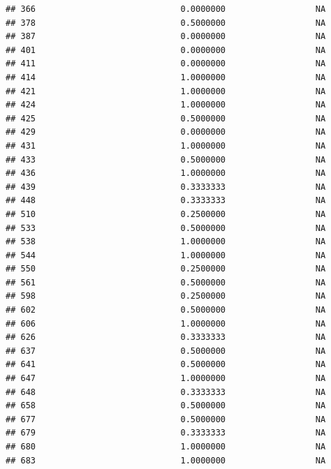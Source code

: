 \documentclass[
]{article}
\begin{document}
\begin{verbatim}
## 366                             0.0000000                  NA
## 378                             0.5000000                  NA
## 387                             0.0000000                  NA
## 401                             0.0000000                  NA
## 411                             0.0000000                  NA
## 414                             1.0000000                  NA
## 421                             1.0000000                  NA
## 424                             1.0000000                  NA
## 425                             0.5000000                  NA
## 429                             0.0000000                  NA
## 431                             1.0000000                  NA
## 433                             0.5000000                  NA
## 436                             1.0000000                  NA
## 439                             0.3333333                  NA
## 448                             0.3333333                  NA
## 510                             0.2500000                  NA
## 533                             0.5000000                  NA
## 538                             1.0000000                  NA
## 544                             1.0000000                  NA
## 550                             0.2500000                  NA
## 561                             0.5000000                  NA
## 598                             0.2500000                  NA
## 602                             0.5000000                  NA
## 606                             1.0000000                  NA
## 626                             0.3333333                  NA
## 637                             0.5000000                  NA
## 641                             0.5000000                  NA
## 647                             1.0000000                  NA
## 648                             0.3333333                  NA
## 658                             0.5000000                  NA
## 677                             0.5000000                  NA
## 679                             0.3333333                  NA
## 680                             1.0000000                  NA
## 683                             1.0000000                  NA
\end{verbatim}
\end{document}

